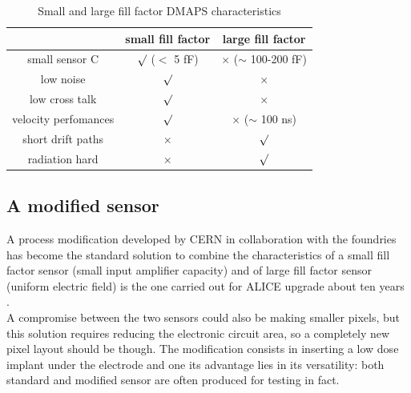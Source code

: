       \begin{table}
         \begin{center}
         \begin{tabular}{|c | c |c |}
         \hline
         & small fill factor & large fill factor\\
         \hline
         \hline
         small sensor C & $\surd$ ($<$ 5 fF) & $\times$ ($\sim$ 100-200 fF)\\
         low noise & $\surd$ & $\times$\\
         low cross talk & $\surd$ & $\times$ \\
         velocity perfomances & $\surd$ & $\times$ ($\sim$ 100 ns)\\
         short drift paths & $\times$ & $\surd$ \\
         radiation hard & $\times$ & $\surd$ \\
         \hline
         \end{tabular}
         \caption{Small and large fill factor DMAPS characteristics}
         \label{tab:DMAPS_large_small_fillfactor}
         \end{center}
      \end{table}

   \subsection{A modified sensor}\label{chap:a_modified_sensor}
      A process modification developed by CERN in collaboration with the foundries has become the standard solution to combine the characteristics of a small fill factor sensor (small input amplifier capacity) and of large fill factor sensor (uniform electric field) is the one carried out for ALICE upgrade about ten years \cite{AProcessModification}.\\
      A compromise between the two sensors could also be making smaller pixels, but this solution requires reducing the electronic circuit area, so a completely new pixel layout should be though. The modification consists in inserting a low dose implant under the electrode and one its advantage lies in its versatility: both standard and modified sensor are often produced for testing in fact.

